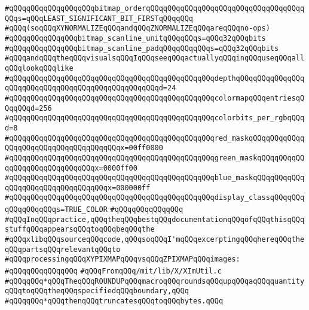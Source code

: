 \verb|#qQQqqQQqqQQqqQQqqQQqbitmap_orderqQQqqQQqqQQqqQQqqQQqqQQqqQQqqQQqqQQqqQQqs=qQQqLEAST_SIGNIFICANT_BIT_FIRSTqQQqqQQq|\newline
\verb|#qQQq(soqQQqXYNORMALIZEqQQqandqQQqZNORMALIZEqQQqareqQQqno-ops)|\newline
\verb|#qQQqqQQqqQQqqQQqbitmap_scanline_unitqQQqqQQqs=qQQq32qQQqbits|\newline
\verb|#qQQqqQQqqQQqqQQqbitmap_scanline_padqQQqqQQqqQQqs=qQQq32qQQqbits|\newline
\verb|#qQQqandqQQqtheqQQqvisualsqQQqIqQQqseeqQQqactuallyqQQqinqQQquseqQQqallqQQqlookqQQqlike|\newline
\verb|#qQQqqQQqqQQqqQQqqQQqqQQqqQQqqQQqqQQqqQQqqQQqqQQqdepthqQQqqQQqqQQqqQQqqQQqqQQqqQQqqQQqqQQqqQQqqQQqqQQqqQQqd=24|\newline
\verb|#qQQqqQQqqQQqqQQqqQQqqQQqqQQqqQQqqQQqqQQqqQQqqQQqcolormapqQQqentriesqQQqqQQqd=256|\newline
\verb|#qQQqqQQqqQQqqQQqqQQqqQQqqQQqqQQqqQQqqQQqqQQqqQQqcolorbits_per_rgbqQQqd=8|\newline
\verb|#qQQqqQQqqQQqqQQqqQQqqQQqqQQqqQQqqQQqqQQqqQQqqQQqred_maskqQQqqQQqqQQqqQQqqQQqqQQqqQQqqQQqqQQqqQQqx=00ff0000|\newline
\verb|#qQQqqQQqqQQqqQQqqQQqqQQqqQQqqQQqqQQqqQQqqQQqqQQqgreen_maskqQQqqQQqqQQqqQQqqQQqqQQqqQQqqQQqx=0000ff00|\newline
\verb|#qQQqqQQqqQQqqQQqqQQqqQQqqQQqqQQqqQQqqQQqqQQqqQQqblue_maskqQQqqQQqqQQqqQQqqQQqqQQqqQQqqQQqqQQqx=000000ff|\newline
\verb|#qQQqqQQqqQQqqQQqqQQqqQQqqQQqqQQqqQQqqQQqqQQqqQQqdisplay_classqQQqqQQqqQQqqQQqqQQqs=TRUE_COLOR|\newline
\verb|#qQQqqQQqqQQqqQQq|\newline
\verb|#qQQqInqQQqpractice,qQQqtheqQQqbestqQQqdocumentationqQQqofqQQqthisqQQqstuffqQQqappearsqQQqtoqQQqbeqQQqthe|\newline
\verb|#qQQqxlibqQQqsourceqQQqcode,qQQqsoqQQqI'mqQQqexcerptingqQQqhereqQQqtheqQQqpartsqQQqrelevantqQQqto|\newline
\verb|#qQQqprocessingqQQqXYPIXMAPqQQqvsqQQqZPIXMAPqQQqimages:|\newline
\verb|#qQQqqQQqqQQqqQQq|\newline
\verb|#qQQqFromqQQq/mit/lib/X/XImUtil.c|\newline
\verb|#qQQqqQQq*qQQqTheqQQqROUNDUPqQQqmacroqQQqroundsqQQqupqQQqaqQQqquantityqQQqtoqQQqtheqQQqspecifiedqQQqboundary,qQQq|\newline
\verb|#qQQqqQQq*qQQqthenqQQqtruncatesqQQqtoqQQqbytes.qQQq|\newline
